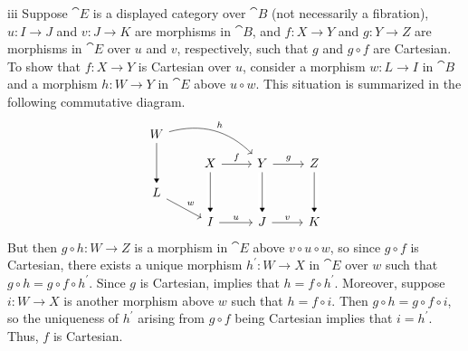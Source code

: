 \begin{partsolution}{iii}
Suppose \(\cat{E}\) is a displayed category over \(\cat{B}\) (not necessarily a fibration), \(u : I \to J\) and \(v : J \to K\) are morphisms in \(\cat{B}\), and \(f : X \to Y\) and \(g : Y \to Z\) are morphisms in \(\cat{E}\) over \(u\) and \(v\), respectively, such that \(g\) and \(g \circ f\) are Cartesian.
To show that \(f : X \to Y\) is Cartesian over \(u\), consider a morphism \(w : L \to I\) in \(\cat{B}\) and a morphism \(h : W \to Y\) in \(\cat{E}\) above \(u \circ w\).
This situation is summarized in the following commutative diagram.
\begin{equation*}
\begin{tikzcd}[row sep=small]
W \arrow[rrd, bend left, "h"] \arrow[dd, -Triangle] \\
& X \arrow[r, "f"] & Y \arrow[r, "g"] & Z \\
L \arrow[rd, "w"] \\
& I \arrow[r, "u"] & J \arrow[r, "v"] & K
\arrow[from=uull, to=ll, -Triangle, crossing over]
\arrow[from=uul, to=l, -Triangle, crossing over]
\arrow[from=uu, -Triangle, crossing over]
\end{tikzcd}
\end{equation*}
But then \(g \circ h : W \to Z\) is a morphism in \(\cat{E}\) above \(v \circ u \circ w\), so since \(g \circ f\) is Cartesian, there exists a unique morphism \(h^\prime : W \to X\) in \(\cat{E}\) over \(w\) such that \(g \circ h = g \circ f \circ h^\prime\).
Since \(g\) is Cartesian,  implies that \(h = f \circ h^\prime\).
Moreover, suppose \(i : W \to X\) is another morphism above \(w\) such that \(h = f \circ i\).
Then \(g \circ h = g \circ f \circ i\), so the uniqueness of \(h^\prime\) arising from \(g \circ f\) being Cartesian implies that \(i = h^\prime\).
Thus, \(f\) is Cartesian.
\end{partsolution}

